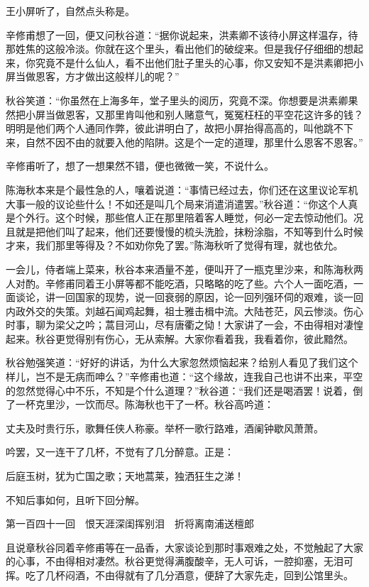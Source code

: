 \documentclass[12pt,UTF8]{ctexbook}
\begin{document}
{{{王小屏听了，自然点头称是。

辛修甫想了一回，便又问秋谷道：“据你说起来，洪素卿不该待小屏这样温存，待那姓焦的这般冷淡。你就在这个里头，看出他们的破绽来。但是我仔仔细细的想起来，你究竟不是什么仙人，看不出他们肚子里头的心事，你又安知不是洪素卿把小屏当做恩客，方才做出这般样儿的呢？”

秋谷笑道：“你虽然在上海多年，堂子里头的阅历，究竟不深。你想要是洪素卿果然把小屏当做恩客，又那里肯叫他和别人赌意气，冤冤枉枉的平空花这许多的钱？明明是他们两个人通同作弊，彼此讲明白了，故把小屏抬得高高的，叫他跳不下来，自然不因不由的就要入他的陷阱。这是个一定的道理，那里什么恩客不恩客。”

辛修甫听了，想了一想果然不错，便也微微一笑，不说什么。

陈海秋本来是个最性急的人，嚷着说道：“事情已经过去，你们还在这里议论军机大事一般的议论些什么！不如还是叫几个局来消遣消遣罢。”秋谷道：“你这个人真是个外行。这个时候，那些倌人正在那里陪着客人睡觉，何必一定去惊动他们。况且就是把他们叫了起来，他们还要慢慢的梳头洗脸，抹粉涂脂，不知等到什么时候才来，我们那里等得及？不如劝你免了罢。”陈海秋听了觉得有理，就也依允。

一会儿，侍者端上菜来，秋谷本来酒量不差，便叫开了一瓶克里沙来，和陈海秋两人对酌。辛修甫同着王小屏等都不能吃酒，只略略的吃了些。六个人一面吃酒，一面谈论，讲一回国家的现势，说一回衰弱的原因，论一回列强环伺的艰难，谈一回内政外交的失策。刘越石闻鸡起舞，祖士雅击楫中流。大陆苍茫，风云惨淡。伤心时事，聊为梁父之吟；蒿目河山，尽有唐衢之恸！大家讲了一会，不由得相对凄惶起来。秋谷更觉得别有伤心，无从索解。大家你看着我，我看着你，彼此黯然。

秋谷勉强笑道：“好好的讲话，为什么大家忽然烦恼起来？给别人看见了我们这个样儿，岂不是无病而呻么？”辛修甫也道：“这个缘故，连我自己也讲不出来，平空的忽然觉得心中不乐，不知是个什么道理？”秋谷道：“我们还是喝酒罢！说着，倒了一杯克里沙，一饮而尽。陈海秋也干了一杯。秋谷高吟道：

丈夫及时贵行乐，歌舞任侠人称豪。举杯一歌行路难，酒阑钟歇风萧萧。

吟罢，又一连干了几杯，不觉有了几分醉意。正是：

后庭玉树，犹为亡国之歌；天地蒿莱，独洒狂生之涕！

不知后事如何，且听下回分解。





第一百四十一回　恨天涯深闺挥别泪　折将离南浦送檀郎





且说章秋谷同着辛修甫等在一品香，大家谈论到那时事艰难之处，不觉触起了大家的心事，不由得相对凄然。秋谷更觉得满腹酸辛，无人可诉，一腔抑塞，无泪可挥。吃了几杯闷酒，不由得就有了几分酒意，便辞了大家先走，回到公馆里头。

}}}
\end{document}
